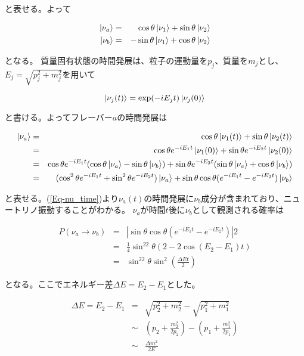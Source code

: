 \documentclass[a4paper,10pt]{jreport}
\begin{document}
と表せる。よって

\begin{eqnarray}
	\ket{\nu_a} &=& \cos\theta\ket{\nu_1}+\sin\theta\ket{\nu_2} \\
	\ket{\nu_b} &=& -\sin\theta\ket{\nu_1}+\cos\theta\ket{\nu_2}
\end{eqnarray}

となる。
質量固有状態の時間発展は、粒子の運動量を$p_j$、質量を$m_j$とし、$E_j=\sqrt{p_j^2+m_j^2}$を用いて

\begin{equation}
	\ket{\nu_j(t)}=\exp(-iE_jt)\ket{\nu_j(0)}
\end{equation}

と書ける。よってフレーバー$a$の時間発展は

\begin{eqnarray} \label{Eq-nu_time}
	\ket{\nu_a}
		&=& \cos\theta\ket{\nu_1(t)}+\sin\theta\ket{\nu_2(t)} \nonumber \\
		&=& \cos\theta e^{-iE_1t}\ket{\nu_1(0)}+\sin\theta e^{-iE_2t}\ket{\nu_2(0)} \nonumber \\
		&=& \cos\theta e^{-iE_1t}(\cos\theta\ket{\nu_a}-\sin\theta\ket{\nu_b})+\sin\theta e^{-iE_2t}(\sin\theta\ket{\nu_a}+		\cos\theta\ket{\nu_b}) \nonumber \\
		&=& (\cos^2\theta e^{-iE_1t}+\sin^2\theta e^{-iE_2t})\ket{\nu_a}+\sin\theta\cos\theta(e^{-iE_1t}-e^{-iE_2t})\ket{\nu_b}
\end{eqnarray}

と表せる。(\ref{Eq-nu_time})より$\nu_a(t)$の時間発展に$\nu_b$成分が含まれており、ニュートリノ振動することがわかる。
$\nu_a$が時間$t$後に$\nu_b$として観測される確率は

\begin{eqnarray} \label{Eq-P_NeutrinoOscillation}
	P(\nu_a\to\nu_b) &=& |\sin\theta\cos\theta(e^{-iE_1t}-e^{-iE_2t})|2 \nonumber \\
	&=& \frac{1}{4}\sin^22\theta(2-2\cos(E_2-E_1)t) \nonumber \\
	&=& \sin^22\theta\sin^2\left(\frac{\Delta Et}{2}\right)
\end{eqnarray}

となる。ここでエネルギー差$\Delta E=E_2-E_1$とした。

\begin{eqnarray} \label{Eq-EnergyDifference}
	\Delta E=E_2-E_1 &=& \sqrt{p_2^2+m_2^2}-\sqrt{p_1^2+m_1^2} \nonumber \\
	&\sim& \left( p_2+\frac{m_2^2}{2p_2} \right)-\left( p_1+\frac{m_1^2}{2p_1} \right) \nonumber \\
	&\sim& \frac{\Delta m^2}{2E}
\end{eqnarray}
\end{document}
